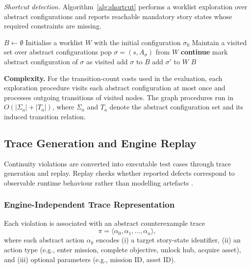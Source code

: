 \documentclass[conference]{IEEEtran}
\begin{document}
\noindent\emph{Shortcut detection.}
Algorithm~\ref{alg:shortcut} performs a worklist exploration over
abstract configurations and reports reachable mandatory story states
whose required constraints are missing.

\begin{algorithm}[t]
  \caption{FindShortcutBugs$(G)$}
  \label{alg:shortcut}
  \begin{algorithmic}[1]
    \STATE $B \gets \emptyset$
    \STATE Initialise a worklist $W$ with the initial configuration $\sigma_0$
    \STATE Maintain a visited set over abstract configurations
      \STATE pop $\sigma = (s, A_\sigma)$ from $W$
        \STATE \textbf{continue}
      \ENDIF
      \STATE mark abstract configuration of $\sigma$ as visited
        \STATE add $\sigma$ to $B$
      \ENDIF
        \STATE add $\sigma'$ to $W$
      \ENDFOR
    \ENDWHILE
    \RETURN $B$
  \end{algorithmic}
\end{algorithm}

\noindent\textbf{Complexity.}
For the transition-count costs used in the evaluation, each exploration
procedure visits each abstract configuration at most once and processes
outgoing transitions of visited nodes. The graph procedures run in
$O(|\Sigma_a| + |T_a|)$, where $\Sigma_a$ and $T_a$ denote the abstract
configuration set and its induced transition relation.

\subsection{Trace Generation and Engine Replay}
\label{sec:trace-replay}

Continuity violations are converted into executable test cases through
trace generation and replay. Replay checks whether reported defects
correspond to observable runtime behaviour rather than modelling
artefacts \cite{Shirzadeh2022Experience, Shirzadehhajimahmood2021RobustGameTesting}.

\subsubsection{Engine-Independent Trace Representation}

Each violation is associated with an abstract counterexample trace
\begin{equation}
\pi = \langle \alpha_0, \alpha_1, \dots, \alpha_n \rangle,
\end{equation}
where each abstract action $\alpha_k$ encodes (i) a target story-state
identifier, (ii) an action type (e.g., enter mission, complete objective,
unlock hub, acquire asset), and (iii) optional parameters (e.g., mission
ID, asset ID).
\end{document}
